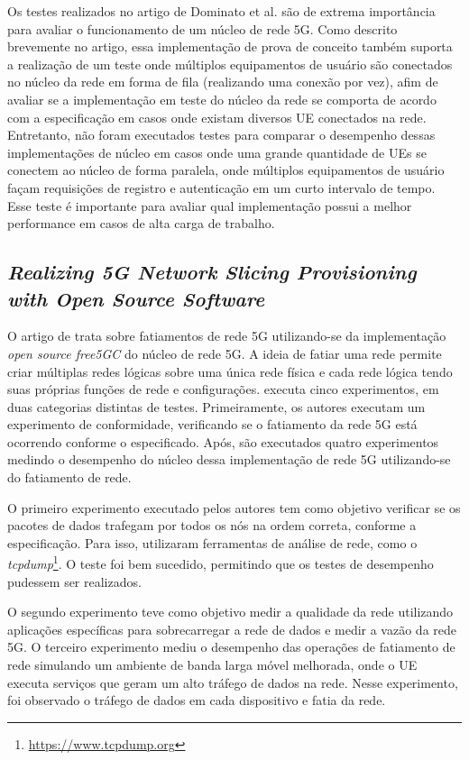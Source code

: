 Os testes realizados no artigo de Dominato et al. são de extrema importância para avaliar o funcionamento de um núcleo de rede 5G.
Como descrito brevemente no artigo, essa implementação de prova de conceito também suporta a realização de um teste onde múltiplos equipamentos de usuário são conectados no núcleo da rede em forma de fila (realizando uma conexão por vez), afim de avaliar se a implementação em teste do núcleo da rede se comporta de acordo com a especificação em casos onde existam diversos UE conectados na rede.
Entretanto, não foram executados testes para comparar o desempenho dessas implementações de núcleo em casos onde uma grande quantidade de UEs se conectem ao núcleo de forma paralela, onde múltiplos equipamentos de usuário façam requisições de registro e autenticação em um curto intervalo de tempo.
Esse teste é importante para avaliar qual implementação possui a melhor performance em casos de alta carga de trabalho.

\subsection{\textit{Realizing 5G Network Slicing Provisioning with Open Source Software}}

O artigo de \cite{Lee2021} trata sobre fatiamentos de rede 5G utilizando-se da implementação \textit{open source free5GC} do núcleo de rede 5G.
A ideia de fatiar uma rede permite criar múltiplas redes lógicas sobre uma única rede física e cada rede lógica tendo suas próprias funções de rede e configurações.
\cite{Lee2021} executa cinco experimentos, em duas categorias distintas de testes. Primeiramente, os autores executam um experimento de conformidade, verificando se o fatiamento da rede 5G está ocorrendo conforme o especificado. Após, são executados quatro experimentos medindo o desempenho do núcleo dessa implementação de rede 5G utilizando-se do fatiamento de rede.

O primeiro experimento executado pelos autores tem como objetivo verificar se os pacotes de dados trafegam por todos os nós na ordem correta, conforme a especificação.
Para isso, utilizaram ferramentas de análise de rede, como o \textit{tcpdump}\footnote{\url{https://www.tcpdump.org}}.
O teste foi bem sucedido, permitindo que os testes de desempenho pudessem ser realizados.

O segundo experimento teve como objetivo medir a qualidade da rede utilizando aplicações específicas para sobrecarregar a rede de dados e medir a vazão da rede 5G.
O terceiro experimento mediu o desempenho das operações de fatiamento de rede simulando um ambiente de banda larga móvel melhorada, onde o UE executa serviços que geram um alto tráfego de dados na rede.
Nesse experimento, foi observado o tráfego de dados em cada dispositivo e fatia da rede.

